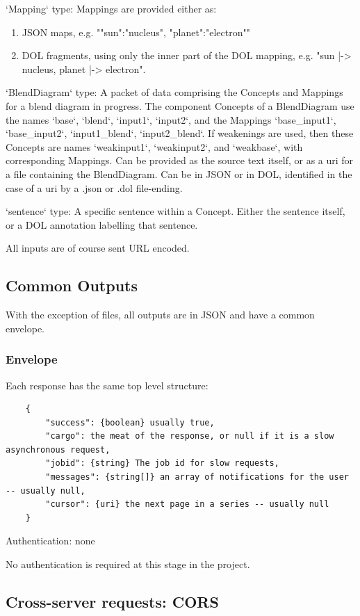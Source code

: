 \documentclass[10pt]{article}
\begin{document}
\begin{appendices}
`Mapping` type: Mappings are provided either as: 
\begin{enumerate}  
\item JSON maps, e.g. "{"sun":"nucleus", "planet":"electron"}"   
\item DOL fragments, using only the inner part of the DOL mapping, e.g. "sun |-> nucleus, planet |-> electron".
\end{enumerate}
`BlendDiagram` type: A packet of data comprising the Concepts and Mappings for a blend diagram in progress. The component Concepts of a BlendDiagram use the names `base`, `blend`, `input1`, `input2`, and the Mappings `base\_input1`, `base\_input2`, `input1\_blend`, `input2\_blend`. If weakenings are used, then these Concepts are names `weakinput1`, `weakinput2`, and `weakbase`, with corresponding Mappings. Can be provided as the source text itself,  
or as a uri for a file containing the BlendDiagram. Can be in JSON or in DOL, identified in the case of a uri by a .json or .dol file-ending.

`sentence` type: A specific sentence within a Concept. Either the sentence itself, 
or a DOL annotation labelling that sentence.

All inputs are of course sent URL encoded.

\subsection{Common Outputs}

With the exception of files, all outputs are in JSON and have a common envelope.

\subsubsection{Envelope}

Each response has the same top level structure:
\begin{verbatim}
	{
		"success": {boolean} usually true,
		"cargo": the meat of the response, or null if it is a slow asynchronous request,
		"jobid": {string} The job id for slow requests,
		"messages": {string[]} an array of notifications for the user -- usually null,
		"cursor": {uri} the next page in a series -- usually null				
	}
\end{verbatim}
Authentication: none

No authentication is required at this stage in the project.

\subsection{Cross-server requests: CORS}


\end{appendices}
\end{document}
